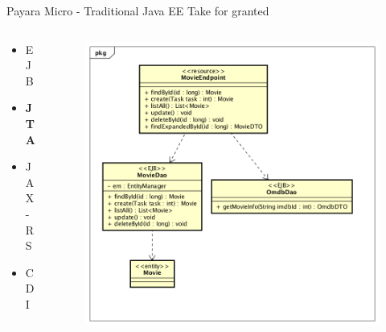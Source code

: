 \documentclass{beamer}
\begin{document}
\begin{frame}{Payara Micro - Traditional Java EE}
Take for granted
\begin{columns}[T] %
\begin{column}[T]{3cm} %
\begin{itemize}
\item EJB
\item \textbf{JTA}
\item JAX-RS
\item CDI
\end{itemize}
\end{column}
\begin{column}[T]{7cm} %
\begin{figure}
\centering
\includegraphics[width=\linewidth]{Images/democlass}
\end{figure}
\end{column}
\end{columns}
\end{frame}
\end{document}
